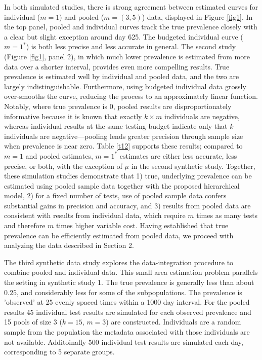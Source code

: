 \documentclass{article}
\begin{document}
In both simulated studies, there is strong agreement between estimated curves for individual ($m=1$) and pooled ($m=(3,5)$) data, displayed in Figure \ref{fig1}. In the top panel, pooled and individual curves track the true prevalence closely with a clear but slight exception around day 625. The budgeted individual curve ($m=1^*$) is both less precise and less accurate in general. The second study (Figure \ref{fig1}, panel 2), in which much lower prevalence is estimated from more data over a shorter interval, provides even more compelling results. True prevalence is estimated well by individual and pooled data, and the two are largely indistinguishable. Furthermore, using budgeted individual data grossly over-smooths the curve, reducing the process to an approximately linear function. Notably, where true prevalence is 0, pooled results are disproportionately informative because it is known that exactly $k\times m$ individuals are negative, whereas individual results at the same testing budget indicate only that $k$ individuals are negative—pooling lends greater precision through sample size when prevalence is near zero. Table \ref{t12} supports these results; compared to $m=1$ and pooled estimates, $m=1^*$ estimates are either less accurate, less precise, or both, with the exception of $\mu$ in the second synthetic study. Together, these simulation studies demonstrate that 1) true, underlying prevalence can be estimated using pooled sample data together with the proposed hierarchical model, 2) for a fixed number of tests, use of pooled sample data confers substantial gains in precision and accuracy, and 3) results from pooled data are consistent with results from individual data, which require $m$ times as many tests and therefore $m$ times higher variable cost. Having established that true prevalence can be efficiently estimated from pooled data, we proceed with analyzing the data described in Section 2.

The third synthetic data study explores the data-integration procedure to combine pooled and individual data. This small area estimation problem parallels the setting in synthetic study 1. The true prevalence is generally less than about $0.25$, and considerably less for some of the subpopulations. The prevalence is 'observed' at 25 evenly spaced times within a 1000 day interval. For the pooled results 45 individual test results are simulated for each observed prevalence and 15 pools of size 3 ($k=15$, $m=3$) are constructed. Individuals are a random sample from the population the metadata associated with those individuals are not available. Additoinally 500 individual test results are simulated each day, corresponding to 5 separate groups.
\end{document}
